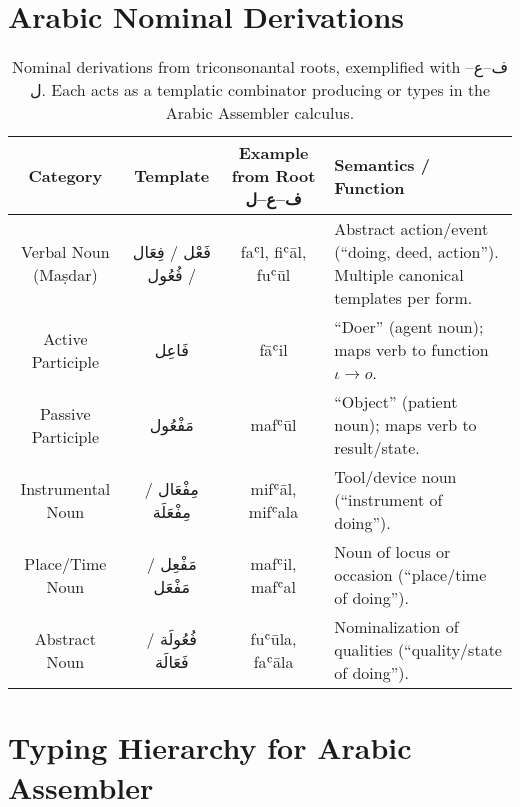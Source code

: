 \documentclass[12pt]{article}
\theoremstyle{remark}
\newcommand{\Verb}{\mathsf{Verb}}
\newcommand{\Noun}{\mathsf{Noun}}
\newcommand{\Partic}{\mathsf{Partic}}
\begin{document}
\section{Arabic Nominal Derivations}
\label{app:nominals}
\renewcommand{\arraystretch}{1.3}
\begin{table}[h!]
\centering
\begin{tabular}{|c|c|c|p{5.5cm}|}
\hline
Category & Template & Example from Root \textarabic{ف–ع–ل} & Semantics / Function \\
\hline
Verbal Noun (Maṣdar) & \textarabic{فَعْل / فِعَال / فُعُول} & faʿl, fiʿāl, fuʿūl & Abstract action/event (“doing, deed, action”). Multiple canonical templates per form. \\
\hline
Active Participle & \textarabic{فَاعِل} & fāʿil & “Doer” (agent noun); maps verb \Verb to function $\iota \to o$. \\
\hline
Passive Participle & \textarabic{مَفْعُول} & mafʿūl & “Object” (patient noun); maps verb \Verb to result/state. \\
\hline
Instrumental Noun & \textarabic{مِفْعَال / مِفْعَلَة} & mifʿāl, mifʿala & Tool/device noun (“instrument of doing”). \\
\hline
Place/Time Noun & \textarabic{مَفْعِل / مَفْعَل} & mafʿil, mafʿal & Noun of locus or occasion (“place/time of doing”). \\
\hline
Abstract Noun & \textarabic{فُعُولَة / فَعَالَة} & fuʿūla, faʿāla & Nominalization of qualities (“quality/state of doing”). \\
\hline
\end{tabular}
\caption{Nominal derivations from triconsonantal roots, exemplified with \textarabic{ف–ع–ل}. Each acts as a templatic combinator producing \Noun or \Partic types in the Arabic Assembler calculus.}
\end{table}

\section{Typing Hierarchy for Arabic Assembler}
\label{app:hierarchy}
\begin{center}
\end{center}
\end{document}
